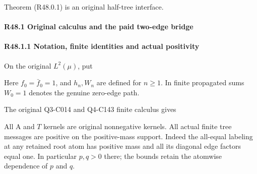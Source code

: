 Theorem (R48.0.1) is an original half-tree interface.

\paragraph{R48.1 Original calculus and the paid two-edge bridge}

\paragraph{R48.1.1 Notation, finite identities and actual positivity}

On the original \(L^2(\mu)\), put




Here \(f_0=\bar f_0=1\), and \(h_n,\allowbreak \allowbreak W_n\) are defined for \(n\ge 1\). In finite propagated sums \(W_0=1\) denotes the genuine zero-edge path.

The original Q3-C014 and Q4-C143 finite calculus gives


All A and \(T\) kernels are original nonnegative kernels. All actual finite tree messages are positive on the positive-mass support. Indeed the all-equal labeling at any retained root atom has positive mass and all its diagonal edge factors equal one. In particular \(p,\allowbreak \allowbreak q > 0\) there; the bounds retain the atomwise dependence of \(p\) and \(q\).

